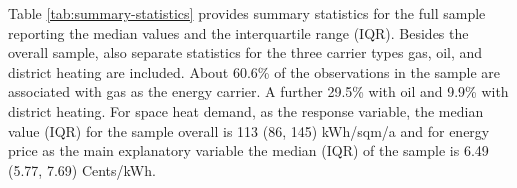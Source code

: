 \documentclass[12pt,twoside]{reedthesis}
\begin{document}
Table \ref{tab:summary-statistics} provides summary statistics for the full sample reporting the median values and the interquartile range (IQR). Besides the overall sample, also separate statistics for the three carrier types gas, oil, and district heating are included. About 60.6\% of the observations in the sample are associated with gas as the energy carrier. A further 29.5\% with oil and 9.9\% with district heating. For space heat demand, as the response variable, the median value (IQR) for the sample overall is 113 (86, 145) kWh/sqm/a and for energy price as the main explanatory variable the median (IQR) of the sample is 6.49 (5.77, 7.69) Cents/kWh.
\begin{table}[]
\centering
\caption{Summary statistics}
\label{tab:summary-statistics}
\end{table}
\end{document}
